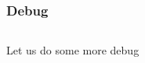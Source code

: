 {

\begin{frame}[fragile]
    \frametitle{Debug}

    \begin{columns}[c]

            Let us do some more debug


    \end{columns}

\end{frame}

}




